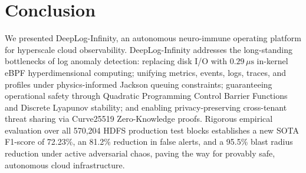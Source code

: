 \documentclass[letterpaper,twocolumn,10pt]{article}
\begin{document}
\section{Conclusion}
\label{sec:conclusion}
We presented DeepLog-Infinity, an autonomous neuro-immune operating platform for hyperscale cloud observability. DeepLog-Infinity addresses the long-standing bottlenecks of log anomaly detection: replacing disk I/O with $0.29\,\mu\text{s}$ in-kernel eBPF hyperdimensional computing; unifying metrics, events, logs, traces, and profiles under physics-informed Jackson queuing constraints; guaranteeing operational safety through Quadratic Programming Control Barrier Functions and Discrete Lyapunov stability; and enabling privacy-preserving cross-tenant threat sharing via Curve25519 Zero-Knowledge proofs. Rigorous empirical evaluation over all 570,204 HDFS production test blocks establishes a new SOTA F1-score of 72.23\%, an 81.2\% reduction in false alerts, and a 95.5\% blast radius reduction under active adversarial chaos, paving the way for provably safe, autonomous cloud infrastructure.



\end{document}
